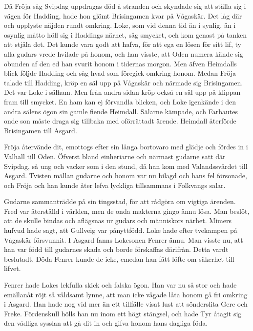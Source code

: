 Då Fröja såg Svipdag uppdragas död å stranden och skyndade sig att
ställa sig i vägen för Hadding, hade hon glömt Brisingamen kvar på
Vågaskär. Det låg där och upplyste näjden rundt omkring. Loke, som vid
denna tid än i synlig, än i osynlig måtto höll sig i Haddings närhet,
såg smycket, och kom genast på tanken att stjäla det. Det kunde vara
godt att hafva, för att ega en lösen för sitt lif, ty alla gudars vrede
hvilade på honom, och han visste, att Oden numera kände sig obunden af
den ed han svurit honom i tidernas morgon. Men äfven Heimdalls blick
följde Hadding och såg hvad som föregick omkring honom. Medan Fröja
talade till Hadding, kröp en säl upp på Vågaskär och närmade sig
Brisingamen. Det var Loke i sälham. Men från andra sidan kröp också en
säl upp på klippan fram till smycket. En ham kan ej förvandla blicken,
och Loke igenkände i den andra sälens ögon sin gamle fiende Heimdall.
Sälarne kämpade, och Farbautes onde son måste draga sig tillbaka med
oförrättadt ärende. Heimdall återförde Brisingamen till Asgard.

Fröja återvände dit, emottogs efter sin långa bortovaro med glädje och
fördes in i Valhall till Oden. Öfverst bland einheriarne och närmast
gudarne satt där Svipdag, så ung och vacker som i den stund, då han kom
med Valandssvärdet till Asgard. Tvisten mällan gudarne och honom var nu
bilagd och hans fel försonade, och Fröja och han kunde åter lefva
lyckliga tillsammans i Folkvangs salar.

Gudarne sammanträdde på sin tingsstad, för att rådgöra om vigtiga
ärenden. Fred var återställd i världen, men de onda makterna gingo ännu
lösa. Man beslöt, att de skulle bindas och aflägsnas ur gudars och
människors närhet. Mimers hufvud hade sagt, att Gullveig var pånyttfödd.
Loke hade efter tvekampen på Vågaskär försvunnit. I Asgard fanns
Lokesonen Fenrer ännu. Man visste nu, att han var född till gudarnes
skada och borde förskaffas därifrån. Detta vardt beslutadt. Döda Fenrer
kunde de icke, emedan han fått löfte om säkerhet till lifvet.

Fenrer hade Lokes lekfulla skick och falska ögon. Han var nu så stor och
hade emällanåt röjt så våldsamt lynne, att man icke vågade låta honom gå
fri omkring i Asgard. Han hade nog vid mer än ett tillfälle visat lust
att sönderslita Gere och Freke. Fördenskull hölls han nu inom ett högt
stängsel, och hade Tyr åtagit sig den vådliga sysslan att gå dit in och
gifva honom hans dagliga föda.

